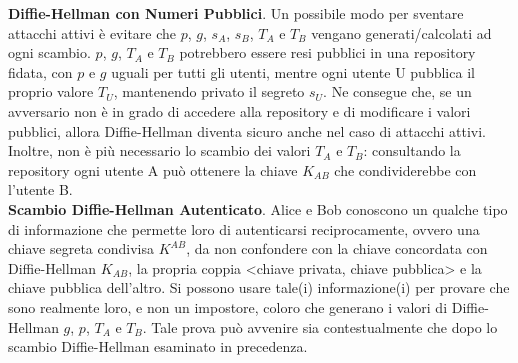 \textbf{Diffie-Hellman con Numeri Pubblici}. Un possibile modo per sventare attacchi attivi è evitare che $p$, $g$, $s_{A}$, $s_{B}$, $T_{A}$ e $T_{B}$ vengano generati/calcolati ad ogni scambio. $p$, $g$, $T_{A}$ e $T_{B}$ potrebbero essere resi pubblici in una repository fidata, con $p$ e $g$ uguali per tutti gli utenti, mentre ogni utente U pubblica il proprio valore $T_{U}$, mantenendo privato il segreto $s_{U}$. Ne consegue che, se un avversario non è in grado di accedere alla repository e di modificare i valori pubblici, allora Diffie-Hellman diventa sicuro anche nel caso di attacchi attivi. Inoltre, non è più necessario lo scambio dei valori $T_{A}$ e $T_{B}$: consultando la repository ogni utente A può ottenere la chiave $K_{AB}$ che condividerebbe con l'utente B. \\

\textbf{Scambio Diffie-Hellman Autenticato}. Alice e Bob conoscono un qualche tipo di informazione che permette loro di autenticarsi reciprocamente, ovvero una chiave segreta condivisa $K^{AB}$, da non confondere con la chiave concordata con Diffie-Hellman $K_{AB}$, la propria coppia <chiave privata, chiave pubblica> e la chiave
pubblica dell'altro. Si possono usare tale(i) informazione(i) per provare che sono realmente loro, e non un impostore, coloro che generano i valori di Diffie-Hellman $g$, $p$, $T_{A}$ e $T_{B}$. Tale prova può avvenire sia contestualmente che dopo lo scambio Diffie-Hellman esaminato in precedenza. 

